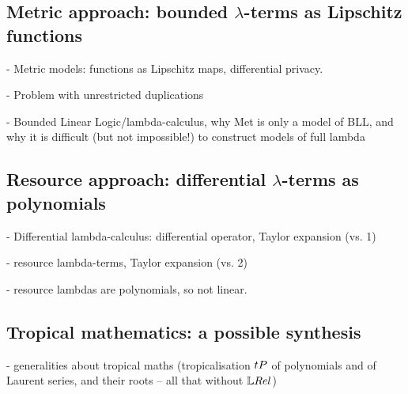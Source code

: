 
\subsection{Metric approach: bounded $\lambda$-terms as Lipschitz functions}

- Metric models: functions as Lipschitz maps, differential privacy.

- Problem with unrestricted duplications

- Bounded Linear Logic/lambda-calculus, why Met is only a model of BLL, and why it is difficult (but not impossible!) to construct models of full lambda

\subsection{Resource approach: differential $\lambda$-terms as polynomials}

- Differential lambda-calculus: differential operator, Taylor expansion (vs. 1)

- resource lambda-terms, Taylor expansion (vs. 2)

- resource lambdas are polynomials, so not linear. 

\subsection{Tropical mathematics: a possible synthesis}

- generalities about tropical maths (tropicalisation $\trop P$  of polynomials and of Laurent series, and their roots -- all that without $\LREL$)





